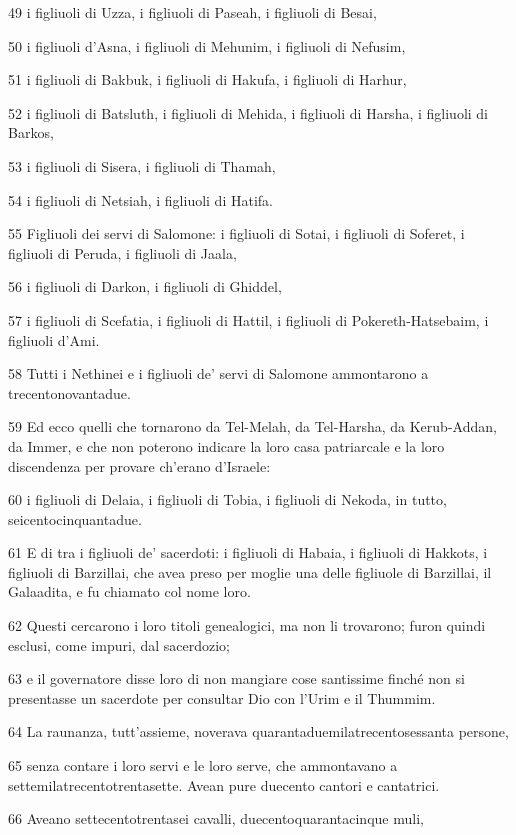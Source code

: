 \par 49 i figliuoli di Uzza, i figliuoli di Paseah, i figliuoli di Besai,
\par 50 i figliuoli d'Asna, i figliuoli di Mehunim, i figliuoli di Nefusim,
\par 51 i figliuoli di Bakbuk, i figliuoli di Hakufa, i figliuoli di Harhur,
\par 52 i figliuoli di Batsluth, i figliuoli di Mehida, i figliuoli di Harsha, i figliuoli di Barkos,
\par 53 i figliuoli di Sisera, i figliuoli di Thamah,
\par 54 i figliuoli di Netsiah, i figliuoli di Hatifa.
\par 55 Figliuoli dei servi di Salomone: i figliuoli di Sotai, i figliuoli di Soferet, i figliuoli di Peruda, i figliuoli di Jaala,
\par 56 i figliuoli di Darkon, i figliuoli di Ghiddel,
\par 57 i figliuoli di Scefatia, i figliuoli di Hattil, i figliuoli di Pokereth-Hatsebaim, i figliuoli d'Ami.
\par 58 Tutti i Nethinei e i figliuoli de' servi di Salomone ammontarono a trecentonovantadue.
\par 59 Ed ecco quelli che tornarono da Tel-Melah, da Tel-Harsha, da Kerub-Addan, da Immer, e che non poterono indicare la loro casa patriarcale e la loro discendenza per provare ch'erano d'Israele:
\par 60 i figliuoli di Delaia, i figliuoli di Tobia, i figliuoli di Nekoda, in tutto, seicentocinquantadue.
\par 61 E di tra i figliuoli de' sacerdoti: i figliuoli di Habaia, i figliuoli di Hakkots, i figliuoli di Barzillai, che avea preso per moglie una delle figliuole di Barzillai, il Galaadita, e fu chiamato col nome loro.
\par 62 Questi cercarono i loro titoli genealogici, ma non li trovarono; furon quindi esclusi, come impuri, dal sacerdozio;
\par 63 e il governatore disse loro di non mangiare cose santissime finché non si presentasse un sacerdote per consultar Dio con l'Urim e il Thummim.
\par 64 La raunanza, tutt'assieme, noverava quarantaduemilatrecentosessanta persone,
\par 65 senza contare i loro servi e le loro serve, che ammontavano a settemilatrecentotrentasette. Avean pure duecento cantori e cantatrici.
\par 66 Aveano settecentotrentasei cavalli, duecentoquarantacinque muli,
